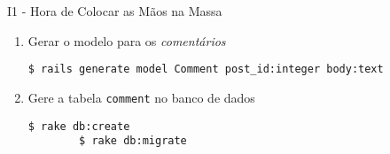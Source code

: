 \begin{frame}{I1 - Hora de Colocar as Mãos na Massa}
	\begin{enumerate}
		\item Gerar o modelo para os \textit{comentários} 
     \begin{lstlisting}[style=BashInputBasicStyle]
				$ rails generate model Comment post_id:integer body:text
     \end{lstlisting}
    \item Gere a tabela \verb|comment| no banco de dados
    \begin{lstlisting}[style=BashInputBasicStyle]
    	$ rake db:create
	    $ rake db:migrate
    \end{lstlisting}
	\end{enumerate}  
\end{frame}